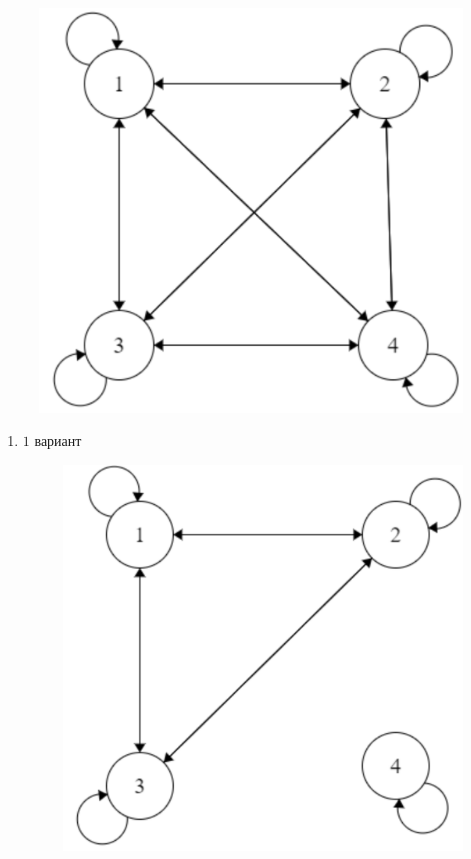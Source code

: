 \documentclass[12pt]{article}
\begin{document}
\begin{enumerate}[label={\textbf{\arabic{section}.\arabic*}}]
		\begin{figure}[h!]
			\centering
			\includegraphics[width=0.4\linewidth]{Снимок экрана_20221123_195120.png}
		\end{figure}
		\begin{enumerate}
			\item $1$ вариант
			\begin{figure}[h]
				\begin{minipage}{0.5\linewidth}
					\centering
					\includegraphics[width=0.8\linewidth]{Снимок экрана_20221123_195159.png}
				\end{minipage}
				\hfill
				\begin{minipage}{0.49\linewidth}
					\centering

\end{minipage}
\end{figure}
\end{enumerate}
\end{enumerate}
\end{document}
